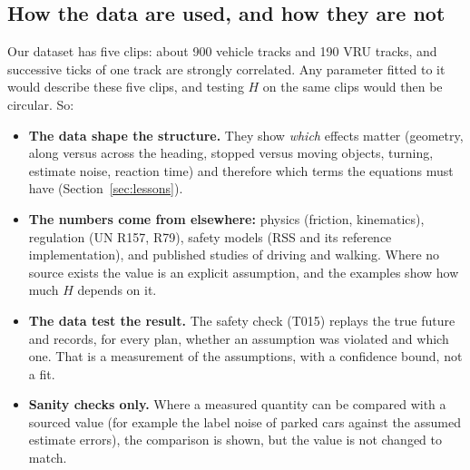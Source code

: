 \documentclass[11pt]{article}
\theoremstyle{definition}
\theoremstyle{remark}
\begin{document}
\subsection{How the data are used, and how they are not}\label{sec:datause}
Our dataset has five clips: about 900 vehicle tracks and 190 VRU tracks, and successive ticks of one
track are strongly correlated. Any parameter fitted to it would describe these five clips, and testing
$H$ on the same clips would then be circular. So:
\begin{itemize}[leftmargin=*]
  \item \textbf{The data shape the structure.} They show \emph{which} effects matter (geometry, along versus
    across the heading, stopped versus moving objects, turning, estimate noise, reaction time) and therefore
    which terms the equations must have (Section~\ref{sec:lessons}).
  \item \textbf{The numbers come from elsewhere:} physics (friction, kinematics), regulation (UN R157,
    R79), safety models (RSS and its reference implementation), and published studies of driving and
    walking. Where no source exists the value is an explicit assumption, and the examples show how
    much $H$ depends on it.
  \item \textbf{The data test the result.} The safety check (T015) replays the true future and records, for
    every plan, whether an assumption was violated and which one. That is a measurement of the assumptions,
    with a confidence bound, not a fit.
  \item \textbf{Sanity checks only.} Where a measured quantity can be compared with a sourced value (for
    example the label noise of parked cars against the assumed estimate errors), the comparison is shown,
    but the value is not changed to match.
\end{itemize}
\end{document}
